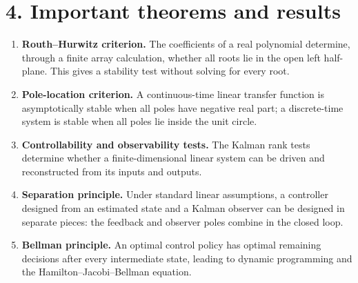 \section*{4. Important theorems and results}
\begin{enumerate}[leftmargin=*,itemsep=0.35em]

\item \textbf{Routh--Hurwitz criterion.} The coefficients of a real polynomial determine, through a finite array calculation, whether all roots lie in the open left half-plane. This gives a stability test without solving for every root. \cite{control_theory_ref3}

\item \textbf{Pole-location criterion.} A continuous-time linear transfer function is asymptotically stable when all poles have negative real part; a discrete-time system is stable when all poles lie inside the unit circle. \cite{control_theory_ref2}

\item \textbf{Controllability and observability tests.} The Kalman rank tests determine whether a finite-dimensional linear system can be driven and reconstructed from its inputs and outputs. \cite{control_theory_ref7}

\item \textbf{Separation principle.} Under standard linear assumptions, a controller designed from an estimated state and a Kalman observer can be designed in separate pieces: the feedback and observer poles combine in the closed loop. \cite{control_theory_ref8}

\item \textbf{Bellman principle.} An optimal control policy has optimal remaining decisions after every intermediate state, leading to dynamic programming and the Hamilton--Jacobi--Bellman equation. \cite{control_theory_ref10}
\end{enumerate}

\theoryapplications
{}
